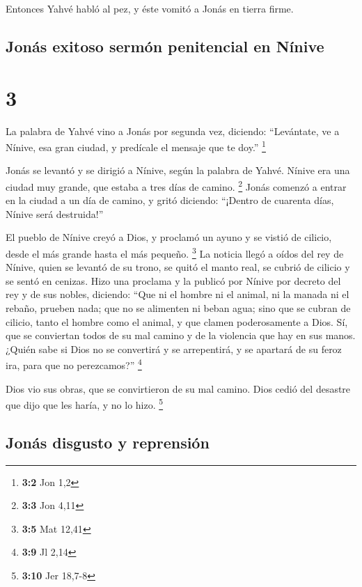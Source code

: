  Entonces Yahvé habló al pez, y éste vomitó a Jonás en
tierra firme.

\hypertarget{jonuxe1s-exitoso-sermuxf3n-penitencial-en-nuxednive}{%
\subsection{Jonás exitoso sermón penitencial en
Nínive}\label{jonuxe1s-exitoso-sermuxf3n-penitencial-en-nuxednive}}

\hypertarget{section-2}{%
\section{3}\label{section-2}}

 La palabra de Yahvé vino a Jonás por segunda vez,
diciendo:  ``Levántate, ve a Nínive, esa gran ciudad, y
predícale el mensaje que te doy.'' \footnote{\textbf{3:2} Jon 1,2}

 Jonás se levantó y se dirigió a Nínive, según la palabra
de Yahvé. Nínive era una ciudad muy grande, que estaba a tres días de
camino. \footnote{\textbf{3:3} Jon 4,11}  Jonás comenzó a
entrar en la ciudad a un día de camino, y gritó diciendo: ``¡Dentro de
cuarenta días, Nínive será destruida!''

 El pueblo de Nínive creyó a Dios, y proclamó un ayuno y
se vistió de cilicio, desde el más grande hasta el más pequeño.
\footnote{\textbf{3:5} Mat 12,41}  La noticia llegó a
oídos del rey de Nínive, quien se levantó de su trono, se quitó el manto
real, se cubrió de cilicio y se sentó en cenizas.  Hizo
una proclama y la publicó por Nínive por decreto del rey y de sus
nobles, diciendo: ``Que ni el hombre ni el animal, ni la manada ni el
rebaño, prueben nada; que no se alimenten ni beban agua; 
sino que se cubran de cilicio, tanto el hombre como el animal, y que
clamen poderosamente a Dios. Sí, que se conviertan todos de su mal
camino y de la violencia que hay en sus manos.  ¿Quién
sabe si Dios no se convertirá y se arrepentirá, y se apartará de su
feroz ira, para que no perezcamos?'' \footnote{\textbf{3:9} Jl 2,14}

 Dios vio sus obras, que se convirtieron de su mal
camino. Dios cedió del desastre que dijo que les haría, y no lo hizo.
\footnote{\textbf{3:10} Jer 18,7-8}

\hypertarget{jonuxe1s-disgusto-y-reprensiuxf3n}{%
\subsection{Jonás disgusto y
reprensión}\label{jonuxe1s-disgusto-y-reprensiuxf3n}}

